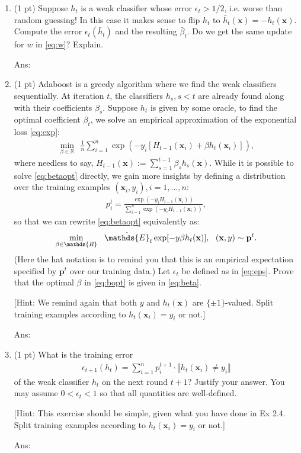 \documentclass[10pt,letter,notitlepage]{article}
\newcommand{\pred}[1]{\llbracket#1\rrbracket}
\newcommand{\RR}{\mathds{R}}
\newcommand{\xv}{\mathbf{x}}
\newcommand{\EE}{\mathds{E}}
\newcommand{\pv}{\mathbf{p}}
\newcommand{\ans}[1]{{\color{orange}\textsf{Ans}: #1}}
\newcounter{exercise}
\begin{document}
\begin{exercise}
\begin{enumerate}

\ans{} 
		\item (1 pt) Suppose $h_t$ is a weak classifier whose error $\epsilon_t > 1/2$, i.e. worse than random guessing! In this case it makes sense to flip $h_t$ to $\bar h_t (\xv) = - h_t(\xv)$. Compute the error $\epsilon_t(\bar h_t)$ and the resulting $\bar \beta_t$. Do we get the same update for $w$ in \eqref{eq:w}? Explain.

\ans{} 
		\item (1 pt) Adaboost is a greedy algorithm where we find the weak classifiers sequentially. At iteration $t$, the classifiers $h_{s}, s < t$ are already found along with their coefficients $\beta_s$. Suppose $h_t$ is given by some oracle, to find the optimal coefficient $\beta_t$, we solve an empirical approximation of the exponential loss \eqref{eq:exp}:
		\begin{align}
		\label{eq:betaopt}
		\min_{\beta\in\RR} ~~ \frac{1}{n}\sum_{i=1}^n \exp(- y_i [H_{t-1}(\xv_i) + \beta h_t(\xv_i)]),
		\end{align}
		where needless to say, $H_{t-1}(\xv) := \sum_{s=1}^{t-1} \beta_s h_s(\xv)$.
		While it is possible to solve \eqref{eq:betaopt} directly, we gain more insights by defining a distribution over the training examples $(\xv_i, y_i), i=1, \ldots, n$:
		\begin{align}
		p_i^t = \frac{\exp(- y_i H_{t-1}(\xv_i))}{\sum_{i=1}^n \exp(- y_i H_{t-1}(\xv_i))},
		\end{align}
		so that we can rewrite \eqref{eq:betaopt} equivalently as:
		\begin{align}
		\label{eq:bopt}
		\min_{\beta \in \RR} ~~ \hat\EE_t \exp[- y \beta h_t(\xv)], ~~ (\xv, y) \sim \pv^t.
		\end{align}
		(Here the hat notation is to remind you that this is an empirical expectation specified by $\pv^t$ over our training data.) Let $\epsilon_t$ be defined as in \eqref{eq:eps}. Prove that the optimal $\beta$ in \eqref{eq:bopt} is given in \eqref{eq:beta}.

		[Hint: We remind again that both $y$ and $h_t(\xv)$ are $\{\pm 1\}$-valued. Split training examples according to $h_t(\xv_i) = y_i$ or not.]

\ans{} 
		\item (1 pt) What is the training error
		\begin{align}
		\epsilon_{t+1}(h_t) = \sum_{i=1}^n p^{t+1}_i \cdot \pred{h_t(\xv_i) \ne y_i}
		\end{align}
		of the weak classifier $h_t$ on the next round $t+1$? Justify your answer. You may assume $0 < \epsilon_t < 1$ so that all quantities are well-defined.

		[Hint: This exercise should be simple, given what you have done in Ex 2.4. Split training examples according to $h_t(\xv_i) = y_i$ or not.]

  \ans{} 
	\end{enumerate}

\end{exercise}
\end{document}
